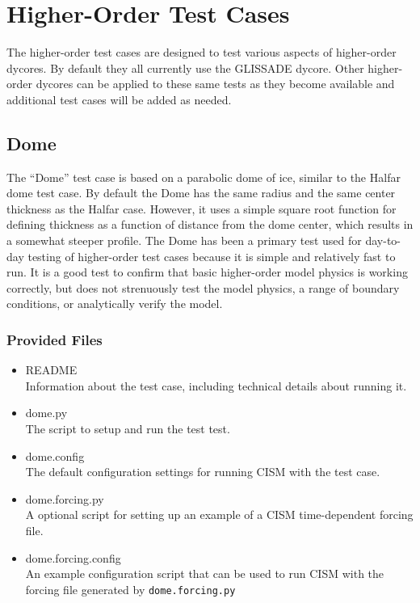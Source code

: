 
\section{Higher-Order Test Cases}
\label{sc:ho-tests}

The higher-order test cases are designed to test various aspects of higher-order dycores.
By default they all currently use the GLISSADE dycore.  Other higher-order dycores can be applied
to these same tests as they become available and additional test cases will be added as needed.

\subsection{Dome}
The ``Dome'' test case is based on a parabolic dome of ice, similar to the Halfar dome test case.
By default the Dome has the same radius and the same center thickness as the Halfar case.
However, it uses a simple square root function for defining thickness as a function 
of distance from the dome center, which results in a somewhat steeper profile.  
The Dome has been a primary test used for day-to-day testing of higher-order
test cases because it is simple and relatively fast to run.  It is a good test
to confirm that basic higher-order model physics is working correctly, but does
not strenuously test the model physics, a range of boundary conditions, or analytically verify the model.

\subsubsection{Provided Files}

\begin{itemize}
	\item README \\
		Information about the test case, including technical details about running it.
	\item dome.py \\
		The script to setup and run the test test.
 	 \item dome.config \\
  		The default configuration settings for running CISM with the test case.
	\item dome.forcing.py \\
		A optional script for setting up an example of a CISM time-dependent forcing file.
  	\item dome.forcing.config \\
  		An example configuration script that can be used to run CISM with the forcing file
  		generated by \texttt{dome.forcing.py}
\end{itemize}


